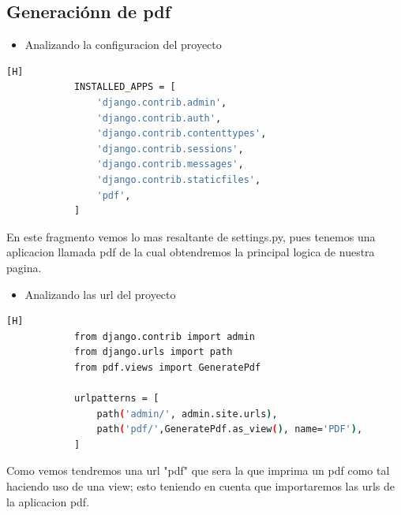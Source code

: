 \documentclass{article}
\begin{document}
        \subsection{Generaciónn de pdf}
        \begin{itemize}
            \item Analizando la configuracion del proyecto
        \end{itemize}
        \begin{lstlisting}[language=bash,caption={Archivo settings.py}][H]
            INSTALLED_APPS = [
                'django.contrib.admin',
                'django.contrib.auth',
                'django.contrib.contenttypes',
                'django.contrib.sessions',
                'django.contrib.messages',
                'django.contrib.staticfiles',
                'pdf',
            ]
	\end{lstlisting}
        En este fragmento vemos lo mas resaltante de settings.py, pues tenemos una aplicacion llamada pdf de la cual obtendremos la principal logica de nuestra pagina.
        \newline
        
        \begin{itemize}
            \item Analizando las url del proyecto
        \end{itemize}
        \begin{lstlisting}[language=bash,caption={Archivo urls.py}][H]
            from django.contrib import admin
            from django.urls import path
            from pdf.views import GeneratePdf
            
            urlpatterns = [
                path('admin/', admin.site.urls),
                path('pdf/',GeneratePdf.as_view(), name='PDF'),
            ]
	\end{lstlisting}
        Como vemos tendremos una url "pdf" que sera la que imprima un pdf como tal haciendo uso de una view; esto teniendo en cuenta que importaremos las urls de la aplicacion pdf.
\end{document}
